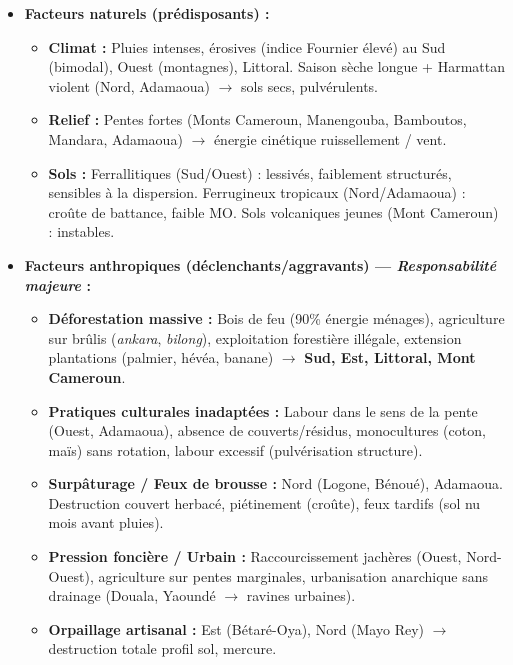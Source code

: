 \documentclass[11pt]{article}
\begin{document}
\begin{corrige}
\begin{itemize}
    \item \textbf{Facteurs naturels (prédisposants) :}
    \begin{itemize}
        \item \textbf{Climat :} Pluies intenses, érosives (indice Fournier élevé) au Sud (bimodal), Ouest (montagnes), Littoral. Saison sèche longue + Harmattan violent (Nord, Adamaoua) $\rightarrow$ sols secs, pulvérulents.
        \item \textbf{Relief :} Pentes fortes (Monts Cameroun, Manengouba, Bamboutos, Mandara, Adamaoua) $\rightarrow$ énergie cinétique ruissellement / vent.
        \item \textbf{Sols :} Ferrallitiques (Sud/Ouest) : lessivés, faiblement structurés, sensibles à la dispersion. Ferrugineux tropicaux (Nord/Adamaoua) : croûte de battance, faible MO. Sols volcaniques jeunes (Mont Cameroun) : instables.
    \end{itemize}
    \item \textbf{Facteurs anthropiques (déclenchants/aggravants) — \emph{Responsabilité majeure} :}
    \begin{itemize}
        \item \textbf{Déforestation massive :} Bois de feu (90\% énergie ménages), agriculture sur brûlis (\emph{ankara}, \emph{bilong}), exploitation forestière illégale, extension plantations (palmier, hévéa, banane) $\rightarrow$ \textbf{Sud, Est, Littoral, Mont Cameroun}.
        \item \textbf{Pratiques culturales inadaptées :} Labour dans le sens de la pente (Ouest, Adamaoua), absence de couverts/résidus, monocultures (coton, maïs) sans rotation, labour excessif (pulvérisation structure).
        \item \textbf{Surpâturage / Feux de brousse :} Nord (Logone, Bénoué), Adamaoua. Destruction couvert herbacé, piétinement (croûte), feux tardifs (sol nu mois avant pluies).
        \item \textbf{Pression foncière / Urbain :} Raccourcissement jachères (Ouest, Nord-Ouest), agriculture sur pentes marginales, urbanisation anarchique sans drainage (Douala, Yaoundé $\rightarrow$ ravines urbaines).
        \item \textbf{Orpaillage artisanal :} Est (Bétaré-Oya), Nord (Mayo Rey) $\rightarrow$ destruction totale profil sol, mercure.
    \end{itemize}
\end{itemize}


\end{corrige}
\end{document}
